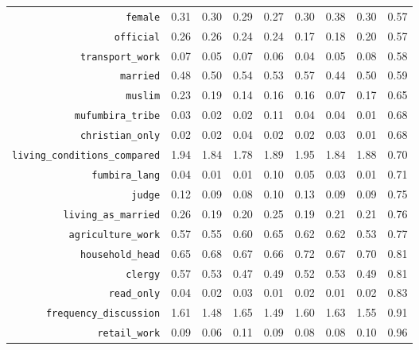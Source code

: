 \begin{longtable}{rrrrrrrrr}
  {\texttt{female}} & 0.31 & 0.30 & 0.29 & 0.27 & 0.30 & 0.38 & 0.30 & 0.57 \\ 
  {\texttt{official}} & 0.26 & 0.26 & 0.24 & 0.24 & 0.17 & 0.18 & 0.20 & 0.57 \\ 
  {\texttt{transport\_work}} & 0.07 & 0.05 & 0.07 & 0.06 & 0.04 & 0.05 & 0.08 & 0.58 \\ 
  {\texttt{married}} & 0.48 & 0.50 & 0.54 & 0.53 & 0.57 & 0.44 & 0.50 & 0.59 \\ 
  {\texttt{muslim}} & 0.23 & 0.19 & 0.14 & 0.16 & 0.16 & 0.07 & 0.17 & 0.65 \\ 
  {\texttt{mufumbira\_tribe}} & 0.03 & 0.02 & 0.02 & 0.11 & 0.04 & 0.04 & 0.01 & 0.68 \\ 
  {\texttt{christian\_only}} & 0.02 & 0.02 & 0.04 & 0.02 & 0.02 & 0.03 & 0.01 & 0.68 \\ 
  {\texttt{living\_conditions\_compared}} & 1.94 & 1.84 & 1.78 & 1.89 & 1.95 & 1.84 & 1.88 & 0.70 \\ 
  {\texttt{fumbira\_lang}} & 0.04 & 0.01 & 0.01 & 0.10 & 0.05 & 0.03 & 0.01 & 0.71 \\ 
  {\texttt{judge}} & 0.12 & 0.09 & 0.08 & 0.10 & 0.13 & 0.09 & 0.09 & 0.75 \\ 
  {\texttt{living\_as\_married}} & 0.26 & 0.19 & 0.20 & 0.25 & 0.19 & 0.21 & 0.21 & 0.76 \\ 
  {\texttt{agriculture\_work}} & 0.57 & 0.55 & 0.60 & 0.65 & 0.62 & 0.62 & 0.53 & 0.77 \\ 
  {\texttt{household\_head}} & 0.65 & 0.68 & 0.67 & 0.66 & 0.72 & 0.67 & 0.70 & 0.81 \\ 
  {\texttt{clergy}} & 0.57 & 0.53 & 0.47 & 0.49 & 0.52 & 0.53 & 0.49 & 0.81 \\ 
  {\texttt{read\_only}} & 0.04 & 0.02 & 0.03 & 0.01 & 0.02 & 0.01 & 0.02 & 0.83 \\ 
  {\texttt{frequency\_discussion}} & 1.61 & 1.48 & 1.65 & 1.49 & 1.60 & 1.63 & 1.55 & 0.91 \\ 
  {\texttt{retail\_work}} & 0.09 & 0.06 & 0.11 & 0.09 & 0.08 & 0.08 & 0.10 & 0.96 \\ 
   \hline
\hline
\end{longtable}
